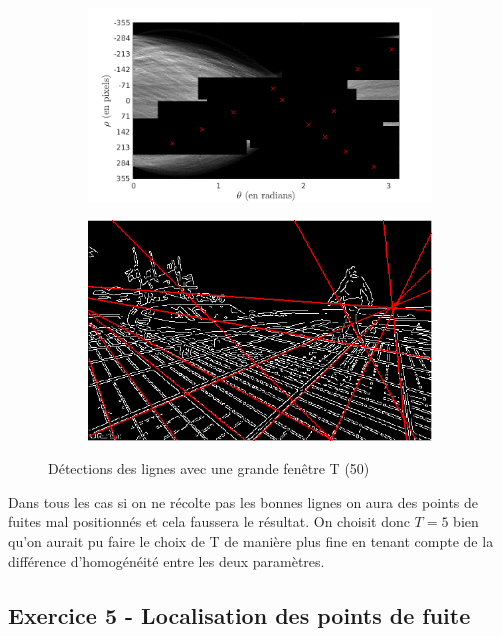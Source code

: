 \documentclass{article}
\begin{document}
\begin{figure}[!ht]
    \centering
    \begin{subfigure}[c]{0.49\linewidth}
        \centering
        \includegraphics[width=\linewidth]{images/5-C_Tgrand.png}
    \end{subfigure}
    \hfill
    \begin{subfigure}[c]{0.49\linewidth}
        \centering
        \includegraphics[width=\linewidth]{images/5-lines_Tgrand.png}
    \end{subfigure}
    \caption{Détections des lignes avec une grande fenêtre T (50)}
    \label{5-T-grand}
\end{figure}
Dans tous les cas si on ne récolte pas les bonnes lignes on aura des points de fuites mal positionnés et cela faussera le résultat. On choisit donc $T=5$ bien qu'on aurait pu faire le choix de T de manière plus fine en tenant compte de la différence d'homogénéité entre les deux paramètres.


\subsection{Exercice 5 - Localisation des points de fuite}
\end{document}
